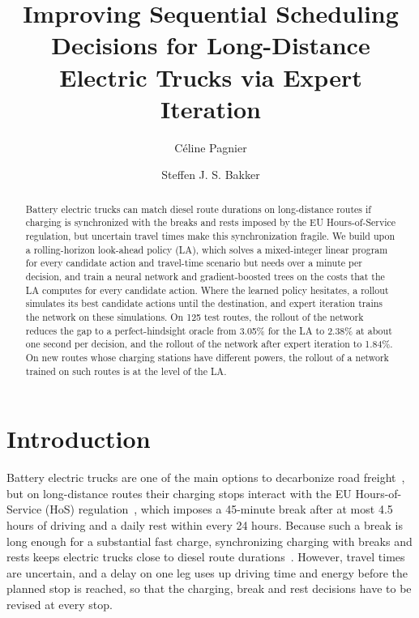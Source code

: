 \documentclass[runningheads]{llncs}
\begin{document}
\title{Improving Sequential Scheduling Decisions for Long-Distance Electric
Trucks via Expert Iteration}

\author{C\'eline Pagnier \and
Steffen J. S. Bakker}

\maketitle

\begin{abstract}
Battery electric trucks can match diesel route durations on long-distance
routes if charging is synchronized with the breaks and rests imposed by the EU
Hours-of-Service regulation, but uncertain travel times make this
synchronization fragile. We build upon a rolling-horizon look-ahead policy
(LA), which solves a mixed-integer linear program for every candidate action
and travel-time scenario but needs over a minute per decision, and train a
neural network and gradient-boosted trees on the costs that the LA computes
for every candidate action. Where the learned policy hesitates, a rollout
simulates its best candidate actions until the destination, and expert
iteration trains the network on these simulations. On 125 test routes, the
rollout of the network reduces the gap to a perfect-hindsight oracle from
3.05\% for the LA to 2.38\% at about one second per decision, and the rollout
of the network after expert iteration to 1.84\%. On new routes whose charging
stations have different powers, the rollout of a network trained on such
routes is at the level of the LA.
\end{abstract}

\section{Introduction}
\label{sec:intro}

Battery electric trucks are one of the main options to decarbonize road
freight~\cite{pagnier2026linking}, but on long-distance routes their charging
stops interact with the EU Hours-of-Service (HoS) regulation~\cite{eu561},
which imposes a 45-minute break after at most 4.5 hours of driving and a daily
rest within every 24 hours. Because such a break is long enough for a
substantial fast charge, synchronizing charging with breaks and rests keeps
electric trucks close to diesel route durations~\cite{brockmann2025}. However,
travel times are uncertain, and a delay on one leg uses up driving time and
energy before the planned stop is reached, so that the charging, break and
rest decisions have to be revised at every stop.
\end{document}
